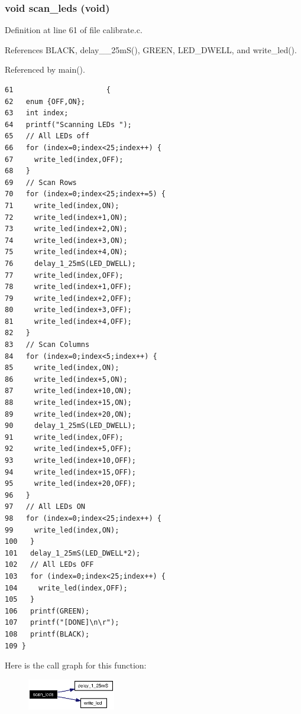 \subsubsection{\setlength{\rightskip}{0pt plus 5cm}void scan\_\-leds (void)}\label{calibrate_8c_a2}




Definition at line 61 of file calibrate.c.

References BLACK, delay\_\_\-25m\-S(), GREEN, LED\_\-DWELL, and write\_\-led().

Referenced by main().

\footnotesize\begin{verbatim}61                      {
62   enum {OFF,ON};
63   int index; 
64   printf("Scanning LEDs ");
65   // All LEDs off
66   for (index=0;index<25;index++) {
67     write_led(index,OFF);
68   }
69   // Scan Rows 
70   for (index=0;index<25;index+=5) {
71     write_led(index,ON);
72     write_led(index+1,ON);
73     write_led(index+2,ON);
74     write_led(index+3,ON);
75     write_led(index+4,ON);
76     delay_1_25mS(LED_DWELL);
77     write_led(index,OFF);
78     write_led(index+1,OFF);
79     write_led(index+2,OFF);
80     write_led(index+3,OFF);
81     write_led(index+4,OFF);
82   }
83   // Scan Columns 
84   for (index=0;index<5;index++) {
85     write_led(index,ON);
86     write_led(index+5,ON);
87     write_led(index+10,ON);
88     write_led(index+15,ON);
89     write_led(index+20,ON);
90     delay_1_25mS(LED_DWELL);
91     write_led(index,OFF);
92     write_led(index+5,OFF);
93     write_led(index+10,OFF);
94     write_led(index+15,OFF);
95     write_led(index+20,OFF);
96   }
97   // All LEDs ON
98   for (index=0;index<25;index++) {
99     write_led(index,ON);
100   }
101   delay_1_25mS(LED_DWELL*2);
102   // All LEDs OFF
103   for (index=0;index<25;index++) {
104     write_led(index,OFF);
105   }
106   printf(GREEN);
107   printf("[DONE]\n\r");
108   printf(BLACK);
109 }
\end{verbatim}\normalsize 




Here is the call graph for this function:\begin{figure}[H]
\begin{center}
\leavevmode
\includegraphics[width=109pt]{calibrate_8c_a2_cgraph}
\end{center}
\end{figure}
